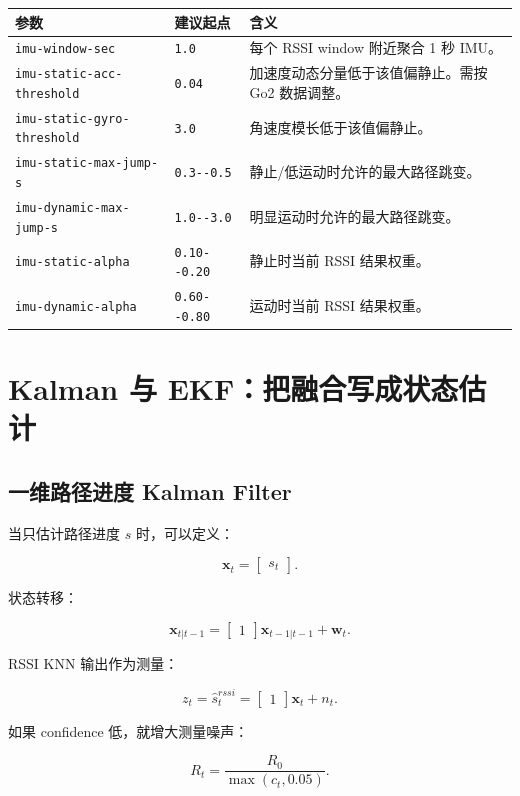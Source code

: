 \documentclass[11pt,a4paper,openany]{report}
\newcommand{\code}[1]{\nolinkurl{#1}}
\newcommand{\param}[1]{\nolinkurl{#1}}
\begin{document}
\begin{longtable}{p{}p{}p{}}
\toprule
参数 & 建议起点 & 含义 \\
\midrule
\param{imu-window-sec} & \code{1.0} & 每个 RSSI window 附近聚合 1 秒 IMU。 \\
\param{imu-static-acc-threshold} & \code{0.04} & 加速度动态分量低于该值偏静止。需按 Go2 数据调整。 \\
\param{imu-static-gyro-threshold} & \code{3.0} & 角速度模长低于该值偏静止。 \\
\param{imu-static-max-jump-s} & \code{0.3--0.5} & 静止/低运动时允许的最大路径跳变。 \\
\param{imu-dynamic-max-jump-s} & \code{1.0--3.0} & 明显运动时允许的最大路径跳变。 \\
\param{imu-static-alpha} & \code{0.10--0.20} & 静止时当前 RSSI 结果权重。 \\
\param{imu-dynamic-alpha} & \code{0.60--0.80} & 运动时当前 RSSI 结果权重。 \\
\bottomrule
\end{longtable}

\chapter{Kalman 与 EKF：把融合写成状态估计}
\label{chap:kalman}

\section{一维路径进度 Kalman Filter}

当只估计路径进度 \(s\) 时，可以定义：

\[
  \bm{x}_t =
  \begin{bmatrix}
    s_t
  \end{bmatrix}.
\]

状态转移：

\[
  \bm{x}_{t|t-1}
  =
  \begin{bmatrix}
    1
  \end{bmatrix}
  \bm{x}_{t-1|t-1}
  +
  \bm{w}_t.
\]

RSSI KNN 输出作为测量：

\[
  z_t = \hat{s}_t^{rssi}
  =
  \begin{bmatrix}
    1
  \end{bmatrix}
  \bm{x}_t
  + n_t.
\]

如果 confidence 低，就增大测量噪声：

\[
  R_t = \frac{R_0}{\max(c_t, 0.05)}.
\]
\end{document}
